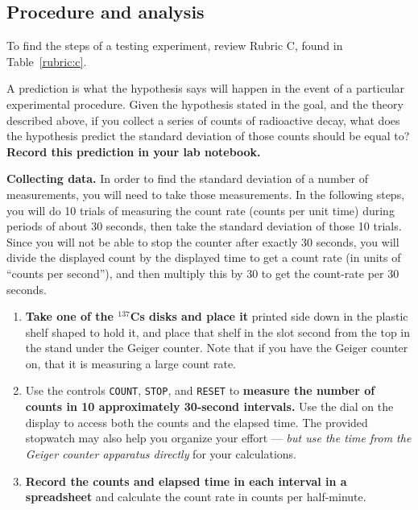 \subsection{Procedure and analysis}

\begin{steps}
	\item To find the steps of a testing experiment, review Rubric C, found in Table~\ref{rubric:c}.
	
	\item\label{rad1:step:predict-random} A prediction is what the hypothesis says will happen in the event of a particular experimental procedure. Given the hypothesis stated in the goal, and the theory described above, if you collect a series of counts of radioactive decay, what does the hypothesis predict the standard deviation of those counts should be equal to? \textbf{Record this prediction in your lab notebook.}
	
	\item \textbf{Collecting data.} In order to find the standard deviation of a number of measurements, you will need to take those measurements. In the following steps, you will do 10 trials of measuring the count rate (counts per unit time) during periods of about 30 seconds, then take the standard deviation of those 10 trials. Since you will not be able to stop the counter after exactly 30 seconds, you will divide the displayed count by the displayed time to get a count rate (in units of ``counts per second''), and then multiply this by 30 to get the count-rate per 30 seconds.
	

	\begin{enumerate}
		\item \textbf{Take one of the $^{137}$Cs disks and place it} printed side down in the plastic shelf shaped to hold it, and place that shelf in the slot second from the top in the stand under the Geiger counter. Note that if you have the Geiger counter on, that it is measuring a large count rate.
		
		\item Use the controls \texttt{COUNT}, \texttt{STOP}, and \texttt{RESET} to \textbf{measure the number of counts in 10 approximately 30-second intervals.} Use the dial on the display to access both the counts and the elapsed time. The provided stopwatch may also help you organize your effort --- \textit{but use the time from the Geiger counter apparatus directly} for your calculations.
		
		\item \textbf{Record the counts and elapsed time in each interval in a spreadsheet} and calculate the count rate in counts per half-minute.
	\end{enumerate}


\end{steps}
